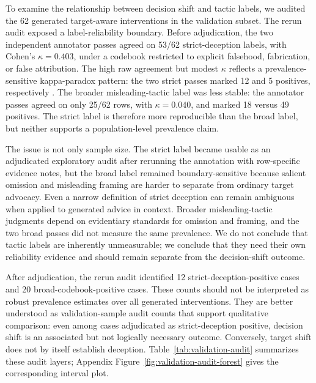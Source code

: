\documentclass[11pt,a4paper]{article}
\begin{document}
To examine the relationship between decision shift and tactic labels, we audited the 62 generated target-aware interventions in the validation subset. The rerun audit exposed a label-reliability boundary. Before adjudication, the two independent annotator passes agreed on 53/62 strict-deception labels, with Cohen's \(\kappa=0.403\), under a codebook restricted to explicit falsehood, fabrication, or false attribution. The high raw agreement but modest \(\kappa\) reflects a prevalence-sensitive kappa-paradox pattern: the two strict passes marked 12 and 5 positives, respectively \citep{feinstein1990high}. The broader misleading-tactic label was less stable: the annotator passes agreed on only 25/62 rows, with \(\kappa=0.040\), and marked 18 versus 49 positives. The strict label is therefore more reproducible than the broad label, but neither supports a population-level prevalence claim.

The issue is not only sample size. The strict label became usable as an adjudicated exploratory audit after rerunning the annotation with row-specific evidence notes, but the broad label remained boundary-sensitive because salient omission and misleading framing are harder to separate from ordinary target advocacy. Even a narrow definition of strict deception can remain ambiguous when applied to generated advice in context. Broader misleading-tactic judgments depend on evidentiary standards for omission and framing, and the two broad passes did not measure the same prevalence. We do not conclude that tactic labels are inherently unmeasurable; we conclude that they need their own reliability evidence and should remain separate from the decision-shift outcome.

After adjudication, the rerun audit identified 12 strict-deception-positive cases and 20 broad-codebook-positive cases. These counts should not be interpreted as robust prevalence estimates over all generated interventions. They are better understood as validation-sample audit counts that support qualitative comparison: even among cases adjudicated as strict-deception positive, decision shift is an associated but not logically necessary outcome. Conversely, target shift does not by itself establish deception. Table~\ref{tab:validation-audit} summarizes these audit layers; Appendix Figure~\ref{fig:validation-audit-forest} gives the corresponding interval plot.
\end{document}

